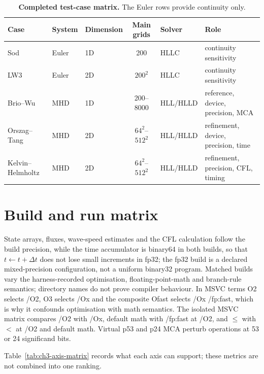 \begin{table}[htbp]
\centering
\small
\begin{tabularx}{\textwidth}{@{}lllclX@{}}
\toprule
Case & System & Dimension & Main grids & Solver & Role \\
\midrule
Sod & Euler & 1D & 200 & HLLC & continuity sensitivity \\
LW3 & Euler & 2D & $200^2$ & HLLC & continuity sensitivity \\
Brio--Wu & MHD & 1D & 200--8000 & HLL/HLLD & reference, device, precision, MCA \\
Orszag--Tang & MHD & 2D & $64^2$--$512^2$ & HLL/HLLD & refinement, device, precision, time \\
Kelvin--Helmholtz & MHD & 2D & $64^2$--$512^2$ & HLL/HLLD & refinement, precision, CFL, timing \\
\bottomrule
\end{tabularx}
\caption[Completed test-case matrix]{\textbf{Completed test-case matrix.}
The Euler rows provide continuity only.}
\label{tab:ch3-case-matrix}
\end{table}

\section{Build and run matrix}

State arrays, fluxes, wave-speed estimates and the CFL calculation follow the
build precision, while the time accumulator is binary64 in both builds, so that
$t \leftarrow t+\Delta t$ does not lose small increments in fp32; the fp32
build is a declared mixed-precision configuration, not a uniform binary32
program. Matched builds vary the harness-recorded optimisation,
floating-point-math and branch-rule semantics; directory names do not prove
compiler behaviour. In MSVC terms O2 selects /O2, O3 selects /Ox and the
composite Ofast selects /Ox /fp:fast, which is why it confounds optimisation
with math semantics. The
isolated MSVC matrix compares /O2 with /Ox, default math with /fp:fast at /O2,
and $\leq$ with $<$ at /O2 and default math. Virtual p53 and p24 MCA perturb
operations at 53 or 24 significand bits.

Table~\ref{tab:ch3-axis-matrix} records what each axis can support; these
metrics are not combined into one ranking.

